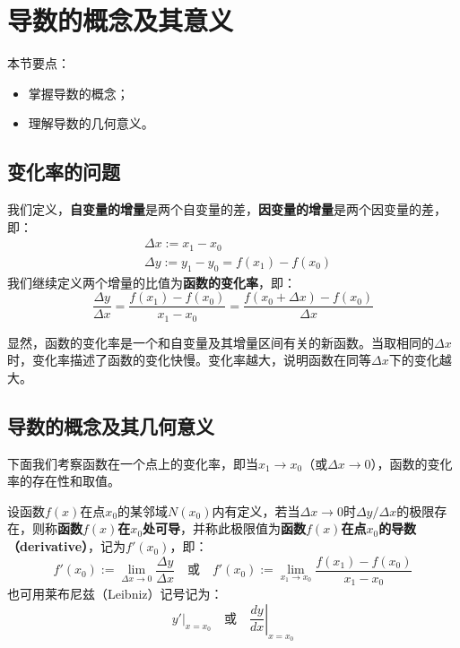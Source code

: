 \section{导数的概念及其意义}

本节要点：
\begin{itemize}
    \item 掌握导数的概念；
    \item 理解导数的几何意义。
\end{itemize}

\subsection{变化率的问题}

\begin{definition}[增量和变化率]
我们定义，{\bf 自变量的增量}是两个自变量的差，{\bf 因变量的增量}是两个因变量的差，即：
\begin{align*}
&\Delta x:=x_1-x_0 \\
&\Delta y:=y_1-y_0=f\left( x_1 \right) -f\left( x_0 \right)
\end{align*}
我们继续定义两个增量的比值为{\bf 函数的变化率}，即：
\[
\frac{\Delta y}{\Delta x}=\frac{f\left( x_1 \right) -f\left( x_0 \right)}{x_1-x_0}=\frac{f\left( x_0+\Delta x \right) -f\left( x_0 \right)}{\Delta x}
\]
\end{definition}

显然，函数的变化率是一个和自变量及其增量区间有关的新函数。当取相同的$\Delta x$时，变化率描述了函数的变化快慢。变化率越大，说明函数在同等$\Delta x$下的变化越大。

\subsection{导数的概念及其几何意义}

下面我们考察函数在一个点上的变化率，即当$x_1\rightarrow x_0$（或$\Delta x\rightarrow 0$），函数的变化率的存在性和取值。

\begin{definition}[导数]
设函数$f\left( x \right) $在点$x_0$的某邻域$N\left( x_0 \right) $内有定义，若当$\Delta x\rightarrow 0$时$\Delta y/\Delta x$的极限存在，则称{\bf 函数$f\left( x \right) $在$x_0$处可导}，并称此极限值为{\bf 函数$f\left( x \right) $在点$x_0$的导数（derivative）}，记为$f'\left( x_0 \right) $，即：
\[
f'\left( x_0 \right) :=\underset{\Delta x\rightarrow 0}{\lim}\frac{\Delta y}{\Delta x} \quad \text{或} \quad f'\left( x_0 \right) :=\underset{x_1\rightarrow x_0}{\lim}\frac{f\left( x_1 \right) -f\left( x_0 \right)}{x_1-x_0}
\]
也可用莱布尼兹（Leibniz）记号记为：
\[
\left. y' \right|_{x=x_0} \quad \text{或} \quad \left. \frac{dy}{dx} \right|_{x=x_0}
\]
\end{definition}

